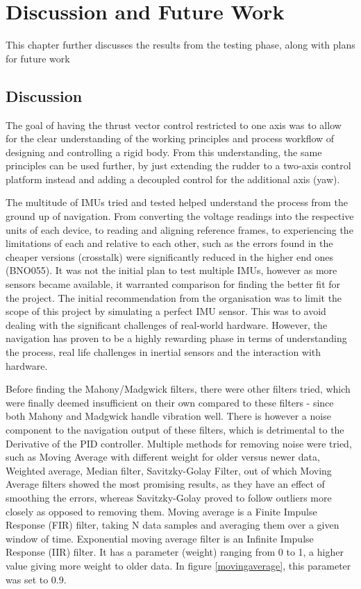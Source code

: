 \chapter{Discussion and Future Work}

This chapter further discusses the results from the testing phase, along with plans for future work

\section{Discussion}

The goal of having the thrust vector control restricted to one axis was to allow for the clear understanding of the working principles and process workflow of designing and controlling a rigid body. 
From this understanding, the same principles can be used further, by just extending the rudder to a two-axis control platform instead and adding a decoupled control for the additional axis (yaw). 

The multitude of IMUs tried and tested helped understand the process from the ground up of navigation. From converting the voltage readings into the respective units of each device, to reading and aligning reference frames, to experiencing the limitations of each and relative to each other, such as the errors found in the cheaper versions (crosstalk) were significantly reduced in the higher end ones (BNO055). It was not the initial plan to test multiple IMUs, however as more sensors became available, it warranted comparison for finding the better fit for the project. 
The initial recommendation from the organisation was to limit the scope of this project by simulating a perfect IMU sensor.
This was to avoid dealing with the significant challenges of real-world hardware. However, the navigation has proven to be a highly rewarding phase in terms of understanding the process, real life challenges in inertial sensors and the interaction with hardware.  
 
Before finding the Mahony/Madgwick filters, there were other filters tried, which were finally deemed insufficient on their own compared to these filters - since both Mahony and Madgwick handle vibration well. There is however a noise component to the navigation output of these filters, which is detrimental to the Derivative of the PID controller. 
Multiple methods for removing noise were tried, such as Moving Average with different weight for older versus newer data, Weighted average, Median filter, Savitzky-Golay Filter, out of which Moving Average filters showed the most promising results, as they have an effect of smoothing the errors, whereas Savitzky-Golay proved to follow outliers more closely as opposed to removing them. 
Moving average is a Finite Impulse Response (FIR) filter, taking N data samples and averaging them over a given window of time. 
Exponential moving average filter is an Infinite Impulse Response (IIR) filter. It has a parameter (weight) ranging from 0 to 1, a higher value giving more weight to older data. In figure  \ref{movingaverage}, this parameter was set to 0.9. 

